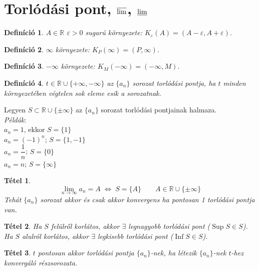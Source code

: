 \documentclass[a4paper,12pt,twoside]{book}
\DeclareMathOperator{\Inf}{Inf}
\DeclareMathOperator{\Sup}{Sup}
\newtheorem{tetel}{Tétel}[chapter]
\newtheorem{defi}{Definíció}[chapter]
\theoremstyle{break}
\theoremstyle{plain}
\begin{document}
\section{Torlódási pont, $\varlimsup$, $\varliminf$}

\begin{defi}
 $A\in\mathbb{R}$ $\varepsilon>0$ sugarú környezete: $K_\varepsilon(A) = (A-\varepsilon, A+\varepsilon)$.
\end{defi}

\begin{defi}
 $\infty$ környezete: $K_P(\infty) = (P, \infty)$.
\end{defi}

\begin{defi}
 $-\infty$ környezete: $K_M(-\infty) = (-\infty, M)$.
\end{defi}

\begin{defi}
 $t\in\mathbb{R}\cup\{+\infty,-\infty\}$ az $\{a_n\}$ sorozat torlódási pontja, ha $t$ minden környezetében végtelen sok eleme esik a sorozatnak.
\end{defi}

Legyen $S\subset\mathbb{R}\cup\{\pm\infty\}$ az $\{a_n\}$ sorozat torlódási pontjainak halmaza.\\

\emph{Példák}:\\
$a_n = 1$, ekkor $S=\{1\}$\\
$a_n = (-1)^n$; $S=\{1, -1\}$\\
$a_n = \dfrac{1}{n}$; $S=\{0\}$\\
$a_n = n$; $S=\{\infty\}$\\

\begin{tetel}
 \[\boxed{\lim_{n\to\infty} a_n = A \; \Leftrightarrow \; S=\{A\} \qquad A\in\mathbb{R}\cup\{\pm\infty\}}\]
Tehát $\{a_n\}$ sorozat akkor és csak akkor konvergens ha pontosan 1 torlódási pontja van.
\end{tetel}
\addtocounter{biz}{1} %

\begin{tetel}
 Ha $S$ felülről korlátos, akkor $\exists$ legnagyobb torlódási pont ($\Sup S\in S$). Ha $S$ alulról korlátos, akkor $\exists$ legkisebb torlódási pont ($\Inf S\in S$).
\end{tetel}
\addtocounter{biz}{1} %

\begin{tetel}
 $t$ pontosan akkor torlódási pontja $\{a_n\}$-nek, ha létezik $\{a_n\}$-nek $t$-hez konvergáló részsorozata.
\end{tetel}
\addtocounter{biz}{1} %
\end{document}
